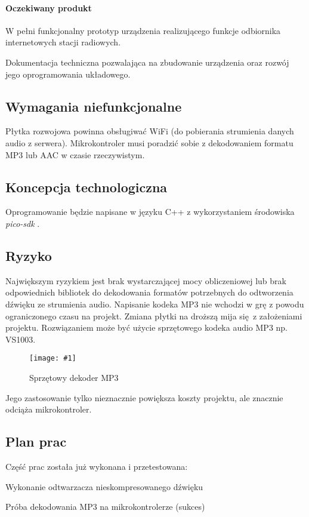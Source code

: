 \documentclass[12pt]{article}
\let\tempone\itemize
\let\temptwo\enditemize
\renewenvironment{itemize}{\tempone\setlength{\itemsep}{0cm}}{\temptwo}
\newcommand{\imgcustomsize}[3]{
	\begin{figure}[H]
		\centering
		\texttt{[image: \#1]}
		\caption{#2}
	\end{figure}
}
\newcommand{\img}[2]{\imgcustomsize{#1}{#2}{0.7}}
\begin{document}
		\paragraph{Oczekiwany produkt}
		\begin{itemize}
			\item W pełni funkcjonalny prototyp urządzenia realizującego funkcje odbiornika internetowych stacji radiowych.
			\item Dokumentacja techniczna pozwalająca na zbudowanie urządzenia oraz rozwój jego oprogramowania układowego.
		\end{itemize}
	
	\subsection{Wymagania niefunkcjonalne}
		Płytka rozwojowa powinna obsługiwać WiFi (do pobierania strumienia danych audio z serwera). Mikrokontroler musi poradzić sobie z dekodowaniem formatu MP3 lub AAC w czasie rzeczywistym.
		
	\subsection{Koncepcja technologiczna}
		Oprogramowanie będzie napisane w języku C++ z wykorzystaniem środowiska \textit{pico-sdk} \textsuperscript{\cite{pico_sdk}}. 
		
	\subsection{Ryzyko}
		Największym ryzykiem jest brak wystarczającej mocy obliczeniowej lub brak odpowiednich bibliotek do dekodowania formatów potrzebnych do odtworzenia dźwięku ze strumienia audio. Napisanie kodeka MP3 nie wchodzi w grę z powodu ograniczonego czasu na projekt. Zmiana płytki na droższą mija się z założeniami projektu. Rozwiązaniem może być użycie sprzętowego kodeka audio MP3 np. VS1003.
		\img{botland_mp3}{Sprzętowy dekoder MP3}
		Jego zastosowanie tylko nieznacznie powiększa koszty projektu, ale znacznie odciąża mikrokontroler.
		
	\subsection{Plan prac}
		Część prac została już wykonana i przetestowana:
		\begin{itemize}
			\item Wykonanie odtwarzacza nieskompresowanego dźwięku
			\item Próba dekodowania MP3 na mikrokontrolerze (sukces)
		\end{itemize}
	
\end{document}
